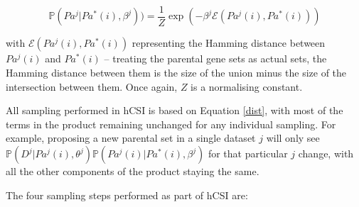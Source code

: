 \documentclass{article}
\begin{document}
\begin{equation*}
\mathbb{P}(Pa^j|Pa^*(i),\beta^j)) = \frac{1}{Z}\exp\left ( -\beta^j\mathcal{E}(Pa^j(i),Pa^*(i)) \right )
\end{equation*}

with $\mathcal{E}(Pa^j(i),Pa^*(i))$ representing the Hamming distance between $Pa^j(i)$ and $Pa^*(i)$ -- treating the parental gene sets as actual sets, the Hamming distance between them is the size of the union minus the size of the intersection between them. Once again, $Z$ is a normalising constant.

All sampling performed in hCSI is based on Equation \ref{dist}, with most of the terms in the product remaining unchanged for any individual sampling. For example, proposing a new parental set in a single dataset $j$ will only see $\mathbb{P}(D^j|Pa^j(i),\theta ^j)\mathbb{P}(Pa^j(i)|Pa^*(i),\beta ^j)$ for that particular $j$ change, with all the other components of the product staying the same.

The four sampling steps performed as part of hCSI are:
\end{document}
